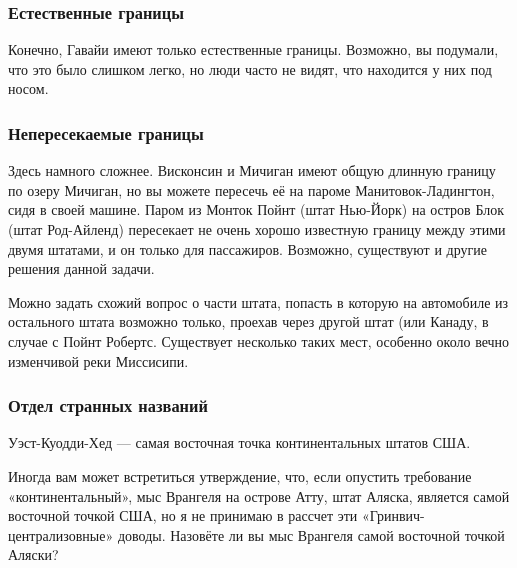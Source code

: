 \subsubsection*{Естественные границы}%


Конечно, Гавайи  имеют только естественные границы. Возможно, вы подумали, что это было слишком легко, но люди часто не видят, что находится у них под носом. 
\heart




\subsubsection*{Непересекаемые границы}%


Здесь намного сложнее. Висконсин и Мичиган имеют общую длинную границу по озеру Мичиган, но вы можете пересечь её на пароме Манитовок-Ладингтон, сидя в своей машине. Паром из Монток Пойнт %
(штат Нью-Йорк) на остров Блок %
(штат Род-Айленд) пересекает не очень хорошо известную границу между этими двумя штатами, и он только для пассажиров. 
Возможно, существуют и другие решения данной задачи.\heart
                                                                                                                    


Можно задать схожий вопрос о части штата, попасть в которую на автомобиле из остального штата возможно только, проехав через другой штат (или Канаду, в случае с 
Пойнт Робертс. %
Существует несколько таких мест, особенно около вечно изменчивой реки Миссисипи.




\subsubsection*{Отдел странных названий}%


Уэст-Куодди-Хед %
--- самая восточная точка континентальных штатов США.\heart
                                                                                                                


Иногда вам может встретиться утверждение,  что, если опустить  требование «континентальный», мыс Врангеля %
на острове Атту, %
штат Аляска, является самой восточной точкой США,  но я не принимаю в рассчет эти «Гринвич-централизовные»  доводы. 
Назовёте ли вы мыс Врангеля самой восточной точкой Аляски?




